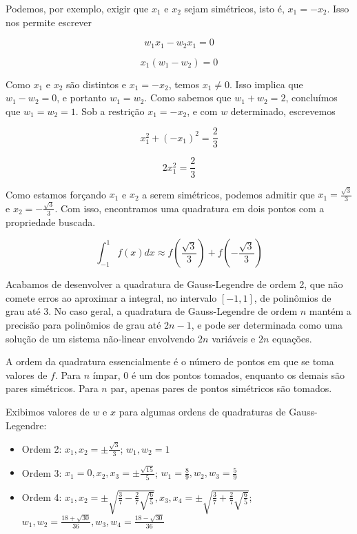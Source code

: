 \documentclass[]{article}
\numberwithin{equation}{section}
\begin{document}
Podemos, por exemplo, exigir que $x_1$ e $x_2$ sejam simétricos, isto é, $x_1 = -x_2$. Isso nos permite escrever

$$
w_1x_1 - w_2x_1 = 0
$$

$$
x_1(w_1 - w_2) = 0
$$

Como $x_1$ e $x_2$ são distintos e $x_1 = - x_2$, temos $x_1 \neq 0$. Isso implica que $w_1 - w_2 = 0$, e portanto $w_1 = w_2$. Como sabemos que $w_1 + w_2 = 2$, concluímos que $w_1 = w_2 = 1$. Sob a restrição $x_1 = -x_2$, e com $w$ determinado, escrevemos

$$
x_1^2 + (-x_1)^2 = \frac{2}{3}
$$

$$
2x_1^2 = \frac{2}{3}
$$

Como estamos forçando $x_1$ e $x_2$ a serem simétricos, podemos admitir que $x_1 = \frac{\sqrt{3}}{3}$ e $x_2 = - \frac{\sqrt{3}}{3}$. Com isso, encontramos uma quadratura em dois pontos com a propriedade buscada.

$$
\int_{-1}^{1} f(x) dx \approx f\left(\frac{\sqrt{3}}{3}\right) + f\left(- \frac{\sqrt{3}}{3}\right)
$$

Acabamos de desenvolver a quadratura de Gauss-Legendre de ordem 2, que não comete erros ao aproximar a integral, no intervalo $[-1, 1]$, de polinômios de grau até 3. No caso geral, a quadratura de Gauss-Legendre de ordem $n$ mantém a precisão para polinômios de grau até $2n - 1$, e pode ser determinada como uma solução de um sistema não-linear envolvendo $2n$ variáveis e $2n$ equações.

A ordem da quadratura essencialmente é o número de pontos em que se toma valores de $f$. Para $n$ ímpar, 0 é um dos pontos tomados, enquanto os demais são pares simétricos. Para $n$ par, apenas pares de pontos simétricos são tomados.

Exibimos valores de $w$ e $x$ para algumas ordens de quadraturas de Gauss-Legendre:

\begin{itemize}
	\item
		Ordem 2: $x_1, x_2 = \pm \frac{\sqrt{3}}{3}$; $w_1, w_2 = 1$
	\item
		Ordem 3: $x_1 = 0, x_2, x_3 = \pm \frac{\sqrt{15}}{5}$; $w_1 = \frac{8}{9}, w_2, w_3 = \frac{5}{9}$
	\item
		Ordem 4: $x_1, x_2 = \pm \sqrt{\frac{3}{7} - \frac{2}{7} \sqrt{\frac{6}{5}}}, x_3, x_4 = \pm \sqrt{\frac{3}{7} + \frac{2}{7} \sqrt{\frac{6}{5}}}$; $w_1, w_2 = \frac{18 + \sqrt{30}}{36}, w_3, w_4 = \frac{18 - \sqrt{30}}{36}$
\end{itemize}
\end{document}
